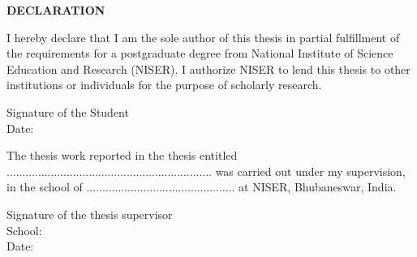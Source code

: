 \begin{center}
{\bf DECLARATION}
\end{center}

I hereby declare that I am the sole author of this thesis in partial fulfillment of the requirements for a postgraduate degree from National Institute of Science Education and Research (NISER). I authorize NISER to lend this thesis to other institutions or individuals for the purpose of scholarly research.

\vskip1.0in

\hspace*{3.0in} {Signature of the Student} \\
\hspace*{3.0in} {Date:}

\vskip1.0in
\vskip1.0in

The thesis work reported in the thesis entitled .................................................................  was carried out under my supervision, in the school of ............................................... at NISER, Bhubaneswar, India.

\vskip1.0in

\hspace*{3.0in} {Signature of the thesis supervisor} \\
\hspace*{3.0in} {School:}\\
\hspace*{3.0in} {Date:}